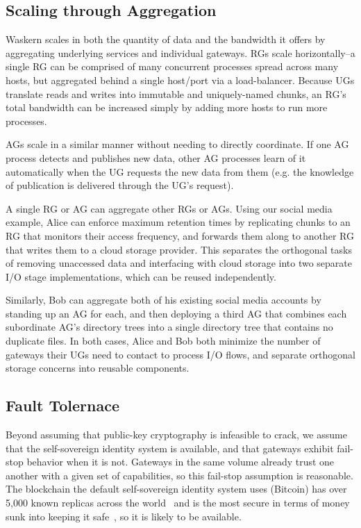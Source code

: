 \subsection{Scaling through Aggregation}

Waskern scales in both the quantity of data and the bandwidth it offers by
aggregating underlying services and individual gateways. RGs scale
horizontally--a single RG can be comprised of many concurrent processes
spread across many hosts, but aggregated behind a single host/port via a
load-balancer. Because UGs translate reads and writes into immutable and
uniquely-named chunks, an RG's total bandwidth can be increased simply by
adding more hosts to run more processes.

AGs scale in a similar manner without needing to directly coordinate. If one AG
process detects and publishes new data, other AG processes learn of it
automatically when the UG requests the new data from them (e.g. the knowledge of
publication is delivered through the UG's request).

A single RG or AG can aggregate other RGs or AGs. Using our social media
example, Alice can enforce maximum retention times by replicating chunks to an
RG that monitors their access frequency, and forwards them along to another RG
that writes them to a cloud storage provider. This separates the orthogonal
tasks of removing unaccessed data and interfacing with cloud storage into two
separate I/O stage implementations, which can be reused independently.

Similarly, Bob can aggregate both of his existing social media accounts by
standing up an AG for each, and then deploying a third AG that combines each
subordinate AG's directory trees into a single directory tree that contains
no duplicate files. In both cases, Alice and Bob both minimize the number of
gateways their UGs need to contact to process I/O flows, and separate orthogonal
storage concerns into reusable components.

\subsection{Fault Tolernace}

Beyond assuming that public-key cryptography is infeasible to crack, we assume
that the self-sovereign identity system is available, and that gateways exhibit
fail-stop behavior when it is not.  Gateways in the same volume already trust one another
with a given set of capabilities, so this fail-stop assumption is
reasonable. The blockchain the default self-sovereign identity system uses (Bitcoin) has over 5,000
known replicas across the world~\cite{coindance} and is the most secure in terms
of money sunk into keeping it safe~\cite{coinmarketcap}, so it is likely to be available.

